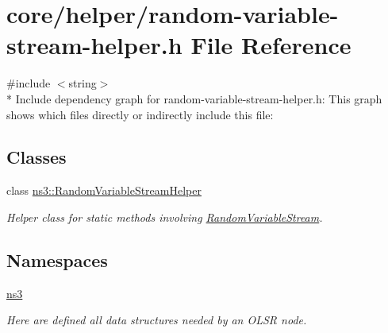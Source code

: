 \hypertarget{random-variable-stream-helper_8h}{}\section{core/helper/random-\/variable-\/stream-\/helper.h File Reference}
\label{random-variable-stream-helper_8h}
{\ttfamily \#include $<$string$>$}\\*
Include dependency graph for random-\/variable-\/stream-\/helper.h\+:
This graph shows which files directly or indirectly include this file\+:
\subsection*{Classes}
\begin{DoxyCompactItemize}
\item 
class \hyperlink{classns3_1_1RandomVariableStreamHelper}{ns3\+::\+Random\+Variable\+Stream\+Helper}
\begin{DoxyCompactList}\small\item\em Helper class for static methods involving \hyperlink{classns3_1_1RandomVariableStream}{Random\+Variable\+Stream}. \end{DoxyCompactList}\end{DoxyCompactItemize}
\subsection*{Namespaces}
\begin{DoxyCompactItemize}
\item 
 \hyperlink{namespacens3}{ns3}
\begin{DoxyCompactList}\small\item\em Here are defined all data structures needed by an O\+L\+SR node. \end{DoxyCompactList}\end{DoxyCompactItemize}

